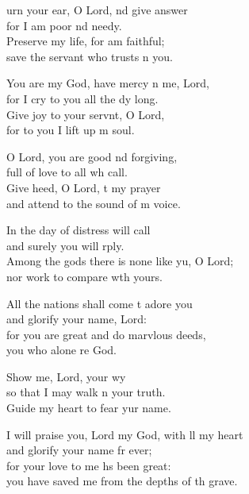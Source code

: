 \settowidth{\versewidth}{I will praise you, Lord my God, with all my heart *}
\begin{psalmverse}%
  \begin{patverse}
urn your ear, O Lord, nd give answer\Med\\
for I am poor nd needy.\\
Preserve my life, for  am faithful;\Med\\
save the servant who trusts \pointup{\i}n you.

You are my God, have mercy n me, Lord,\Med\\
for I cry to you all the dy long.\\
Give joy to your servnt, O Lord,\Med\\
for to you I lift up m soul.

O Lord, you are good nd forgiving,\Med\\
full of love to all wh call.\\
Give heed, O Lord, t my prayer\Med\\
and attend to the sound of m voice.

In the day of distress  will call\Med\\
and surely you will rply.\\
Among the gods there is none like yu, O Lord;\Med\\
nor work to compare w\pointup{\i}th yours.

All the nations shall come t adore you\Med\\
and glorify your name,  Lord:\\
for you are great and do marvlous deeds,\Med\\
you who alone re God.

Show me, Lord, your wy\Flex\\
so that I may walk n your truth.\Med\\
Guide my heart to fear yur name.

I will praise you, Lord my God, with ll my heart\Med\\
and glorify your name fr ever;\\
for your love to me hs been great:\Med\\
you have saved me from the depths of th grave.


\end{patverse}
\end{psalmverse}
